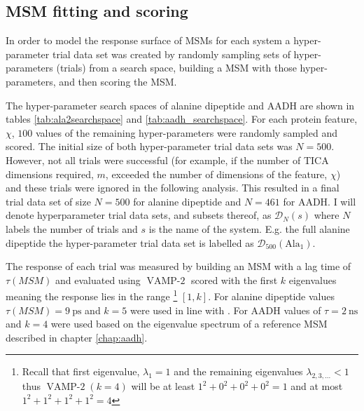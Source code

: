 \subsection{MSM fitting and scoring}\label{subsec:msm_fitting}
In order to  model the response surface of MSMs for each system a  hyper-parameter trial data set was created by randomly sampling sets of hyper-parameters (trials) from a search space, building a MSM with those hyper-parameters, and then scoring the MSM. 

The hyper-parameter search spaces of alanine dipeptide and AADH are shown in tables \ref{tab:ala2searchspace} and \ref{tab:aadh_searchspace}. For each protein feature, $\chi$, $100$ values of the remaining hyper-parameters were randomly sampled and scored. The initial size of both hyper-parameter trial data sets was $N=500$. However, not all trials were successful (for example, if the number of TICA dimensions required, $m$, exceeded the number of dimensions of the feature, $\chi$) and these trials were ignored in the following analysis. This resulted in a final trial data set of size $N=500$ for alanine dipeptide and $N=461$ for AADH. I will denote hyperparameter trial data sets, and subsets thereof, as $\mathcal{D}_{N}(s)$ where $N$ labels the number of trials and $s$ is the name of the system. E.g. the full alanine dipeptide the hyper-parameter trial data set is labelled as $\mathcal{D}_{500}(\mathrm{Ala}_{1})$. 

The response of each trial was measured by building an MSM with a lag time of $\tau(MSM)$ and evaluated using $\operatorname{VAMP-2}$ scored with the first $k$ eigenvalues meaning the response lies in the range \footnote{Recall that first eigenvalue, $\lambda_{1}=1$ and the remaining eigenvalues  $\lambda_{2,3,...} < 1$ thus $\operatorname{VAMP-2}(k=4)$ will be at least $1^2 + 0^2 + 0^2 + 0^2=1$ and at most $1^2 + 1^2 + 1^2 + 1^2=4$} $[1, k]$. For alanine dipeptide values $\tau(MSM)=\SI{9}{\pico\second}$ and $k=5$ were used in line with \cite{bowmanQuantitativeComparisonAlternative2013}.  For AADH values of $\tau=\SI{2}{\nano\second}$ and $k=4$ were used based on the eigenvalue spectrum of a reference MSM described in chapter \ref{chap:aadh}. 

